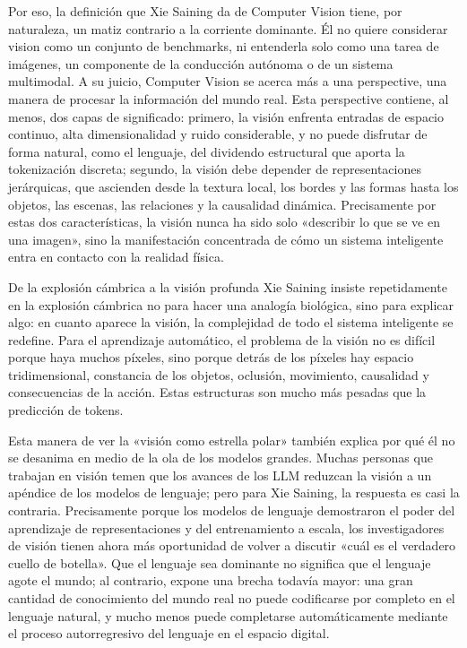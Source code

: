 Por eso, la definición que Xie Saining da de Computer Vision tiene, por naturaleza, un matiz contrario a la corriente dominante. Él no quiere considerar vision como un conjunto de benchmarks, ni entenderla solo como una tarea de imágenes, un componente de la conducción autónoma o de un sistema multimodal. A su juicio, Computer Vision se acerca más a una perspective, una manera de procesar la información del mundo real. Esta perspective contiene, al menos, dos capas de significado: primero, la visión enfrenta entradas de espacio continuo, alta dimensionalidad y ruido considerable, y no puede disfrutar de forma natural, como el lenguaje, del dividendo estructural que aporta la tokenización discreta; segundo, la visión debe depender de representaciones jerárquicas, que ascienden desde la textura local, los bordes y las formas hasta los objetos, las escenas, las relaciones y la causalidad dinámica. Precisamente por estas dos características, la visión nunca ha sido solo «describir lo que se ve en una imagen», sino la manifestación concentrada de cómo un sistema inteligente entra en contacto con la realidad física.

\begin{knowledgebox}{De la explosión cámbrica a la visión profunda}
Xie Saining insiste repetidamente en la explosión cámbrica no para hacer una analogía biológica, sino para explicar algo: en cuanto aparece la visión, la complejidad de todo el sistema inteligente se redefine. Para el aprendizaje automático, el problema de la visión no es difícil porque haya muchos píxeles, sino porque detrás de los píxeles hay espacio tridimensional, constancia de los objetos, oclusión, movimiento, causalidad y consecuencias de la acción. Estas estructuras son mucho más pesadas que la predicción de tokens.
\end{knowledgebox}

Esta manera de ver la «visión como estrella polar» también explica por qué él no se desanima en medio de la ola de los modelos grandes. Muchas personas que trabajan en visión temen que los avances de los LLM reduzcan la visión a un apéndice de los modelos de lenguaje; pero para Xie Saining, la respuesta es casi la contraria. Precisamente porque los modelos de lenguaje demostraron el poder del aprendizaje de representaciones y del entrenamiento a escala, los investigadores de visión tienen ahora más oportunidad de volver a discutir «cuál es el verdadero cuello de botella». Que el lenguaje sea dominante no significa que el lenguaje agote el mundo; al contrario, expone una brecha todavía mayor: una gran cantidad de conocimiento del mundo real no puede codificarse por completo en el lenguaje natural, y mucho menos puede completarse automáticamente mediante el proceso autorregresivo del lenguaje en el espacio digital.

